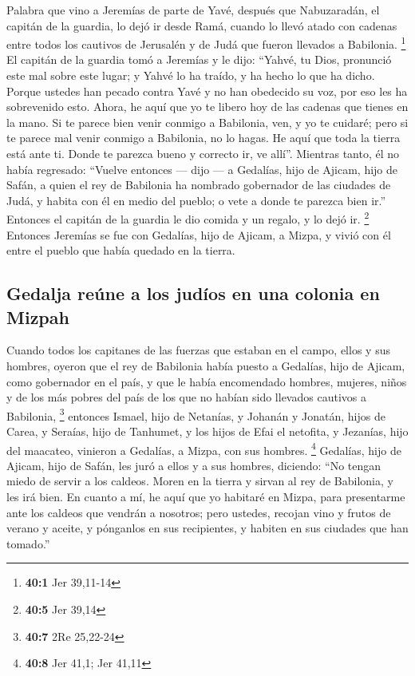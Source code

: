 Palabra que vino a Jeremías de parte de Yavé, después que
Nabuzaradán, el capitán de la guardia, lo dejó ir desde Ramá, cuando lo
llevó atado con cadenas entre todos los cautivos de Jerusalén y de Judá
que fueron llevados a Babilonia. \footnote{\textbf{40:1} Jer 39,11-14}
 El capitán de la guardia tomó a Jeremías y le dijo:
``Yahvé, tu Dios, pronunció este mal sobre este lugar;  y
Yahvé lo ha traído, y ha hecho lo que ha dicho. Porque ustedes han
pecado contra Yavé y no han obedecido su voz, por eso les ha sobrevenido
esto.  Ahora, he aquí que yo te libero hoy de las cadenas
que tienes en la mano. Si te parece bien venir conmigo a Babilonia, ven,
y yo te cuidaré; pero si te parece mal venir conmigo a Babilonia, no lo
hagas. He aquí que toda la tierra está ante ti. Donde te parezca bueno y
correcto ir, ve allí''.  Mientras tanto, él no había
regresado: ``Vuelve entonces --- dijo --- a Gedalías, hijo de Ajicam,
hijo de Safán, a quien el rey de Babilonia ha nombrado gobernador de las
ciudades de Judá, y habita con él en medio del pueblo; o vete a donde te
parezca bien ir.'' Entonces el capitán de la guardia le dio comida y un
regalo, y lo dejó ir. \footnote{\textbf{40:5} Jer 39,14} 
Entonces Jeremías se fue con Gedalías, hijo de Ajicam, a Mizpa, y vivió
con él entre el pueblo que había quedado en la tierra.

\hypertarget{gedalja-reuxfane-a-los-juduxedos-en-una-colonia-en-mizpah}{%
\subsection{Gedalja reúne a los judíos en una colonia en
Mizpah}\label{gedalja-reuxfane-a-los-juduxedos-en-una-colonia-en-mizpah}}

 Cuando todos los capitanes de las fuerzas que estaban en
el campo, ellos y sus hombres, oyeron que el rey de Babilonia había
puesto a Gedalías, hijo de Ajicam, como gobernador en el país, y que le
había encomendado hombres, mujeres, niños y de los más pobres del país
de los que no habían sido llevados cautivos a Babilonia, \footnote{\textbf{40:7}
  2Re 25,22-24}  entonces Ismael, hijo de Netanías, y
Johanán y Jonatán, hijos de Carea, y Seraías, hijo de Tanhumet, y los
hijos de Efai el netofita, y Jezanías, hijo del maacateo, vinieron a
Gedalías, a Mizpa, con sus hombres. \footnote{\textbf{40:8} Jer 41,1;
  Jer 41,11}  Gedalías, hijo de Ajicam, hijo de Safán, les
juró a ellos y a sus hombres, diciendo: ``No tengan miedo de servir a
los caldeos. Moren en la tierra y sirvan al rey de Babilonia, y les irá
bien.  En cuanto a mí, he aquí que yo habitaré en Mizpa,
para presentarme ante los caldeos que vendrán a nosotros; pero ustedes,
recojan vino y frutos de verano y aceite, y pónganlos en sus
recipientes, y habiten en sus ciudades que han tomado.''

